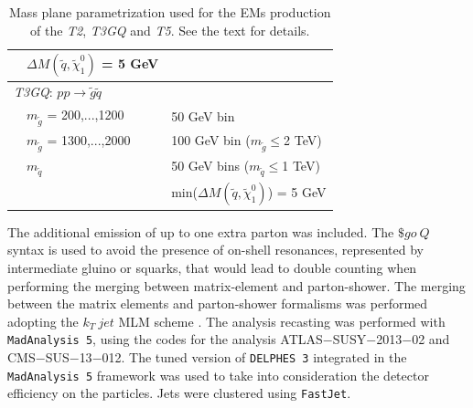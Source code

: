 \documentclass[a4paper,11pt]{article}
\newcommand{\TGQ}{ \textit{T3GQ}}
\begin{document}
\begin{table}
\begin{tabular}{ l l l }
		&$\Delta M(\tilde q, \tilde \chi _1 ^0)$ = 5 GeV&  \\ \midrule
		\multicolumn{3}{l}{\TGQ: $p p \rightarrow \tilde g \tilde q$} \\  
		& $m_{\tilde g}$ = 200,...,1200 & 50 GeV bin \\ 
		& $m_{\tilde g}$ = 1300,...,2000 & 100 GeV bin ($m_{\tilde g}\leq$2 TeV) \\
		& $m_{\tilde q}$ & 50 GeV bins ($m_{\tilde q}\leq$1 TeV) \\
		& & min($\Delta M(\tilde q, \tilde \chi _1 ^0)$) = 5 GeV \\ \bottomrule \bottomrule
	\end{tabular}
	\normalsize
	\caption{Mass plane parametrization used for the EMs production of the \textit{T2}, \textit{T3GQ} and \textit{T5}. See the text for details.}
	\label{TGQ_Planes} 
\end{table}
\fi


The additional emission of up to one extra parton was included. The $\$go \ Q$ syntax is used to avoid the presence of on-shell resonances, represented by intermediate gluino or squarks, that would lead to double counting when performing the merging between matrix-element and parton-shower. The merging between the matrix elements and parton-shower formalisms was performed adopting the $k_T \ jet$ MLM scheme \cite{MLM,Alwall:2007fs}. 
%
The analysis recasting was performed with \texttt{MadAnalysis 5}\cite{Conte:2012fm,Conte:2018vmg}, using the codes for the analysis ATLAS$-$SUSY$-$2013$-$02\cite{ATLAS-SUSY-2013-02MA5,ATLAS-SUSY-2013-02VALIDATION} and CMS$-$SUS$-$13$-$012\cite{CMS-SUS-13-012MA5,CMS-SUS-13-012VALIDATION}. The tuned version of \texttt{DELPHES 3} integrated in the \texttt{MadAnalysis 5} framework was used to take into consideration the detector efficiency on the particles. Jets were clustered using \texttt{FastJet}\cite{Cacciari:2011ma}. 
%
\\
\end{document}
